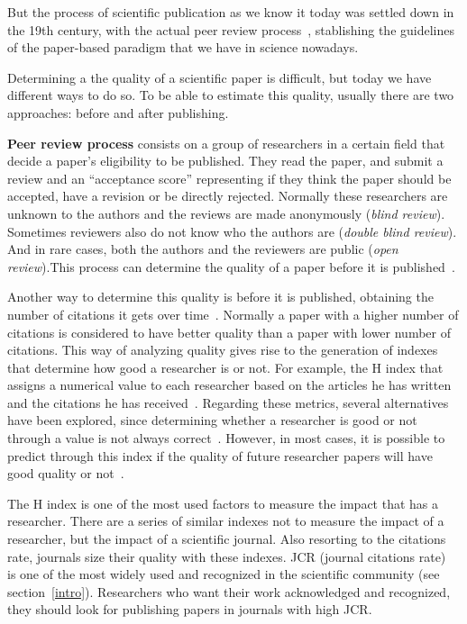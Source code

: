 But the process of scientific publication as we know it today was settled down
in the 19th century, with the actual peer review
process~\cite{burnham1990evolution}, stablishing the guidelines of the
paper-based paradigm that we have in science nowadays.

Determining a the quality of a scientific paper is difficult, but today we have
different ways to do so. To be able to estimate this quality, usually there are
two approaches: before and after publishing.

\textbf{Peer review process} consists on a group of researchers in a certain
field that decide a paper's eligibility to be published. They read the paper,
and submit a review and an ``acceptance score'' representing if they think the
paper should be accepted, have a revision or be directly rejected. Normally
these researchers are unknown to the authors and the reviews are made
anonymously (\emph{blind review}). Sometimes reviewers also do not know who the
authors are (\emph{double blind review}). And in rare cases, both the authors
and the reviewers are public (\emph{open review}).This process can determine the
quality of a paper before it is published~\cite{szklo2006quality}.

Another way to determine this quality is before it is published, obtaining the
number of citations it gets over time~\cite{redner1998popular}. Normally a paper
with a higher number of citations is considered to have better quality than a
paper with lower number of citations. This way of analyzing quality gives rise
to the generation of indexes that determine how good a researcher is or not. For
example, the H index that assigns a numerical value to each researcher based on
the articles he has written and the citations he has
received~\cite{bornmann2007we}. Regarding these metrics, several alternatives
have been explored, since determining whether a researcher is good or not
through a value is not always correct~\cite{bornmann2008there}. However, in most
cases, it is possible to predict through this index if the quality of future
researcher papers will have good quality or not~\cite{hirsch2007does}.

The H index is one of the most used factors to measure the impact that has a
researcher. There are a series of similar indexes not to measure the impact of a
researcher, but the impact of a scientific journal. Also resorting to the
citations rate, journals size their quality with these indexes. JCR (journal
citations rate)~\cite{doi:10.1001/jama.295.1.90} is one of the most widely used
and recognized in the scientific community (see section~\ref{intro}).
Researchers who want their work acknowledged and recognized, they should look
for publishing papers in journals with high JCR.

